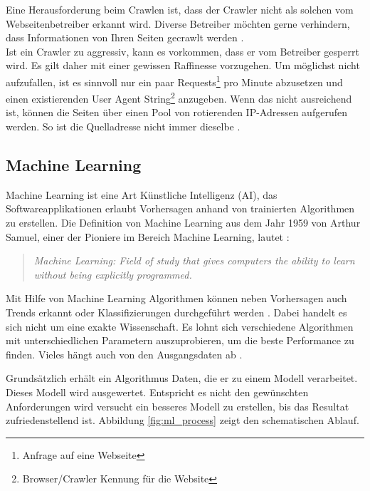 %
Eine Herausforderung beim Crawlen ist, dass der Crawler nicht als solchen vom Webseitenbetreiber erkannt wird. Diverse Betreiber möchten gerne verhindern, dass Informationen von Ihren Seiten gecrawlt werden \cite{comparis}.\\
Ist ein Crawler zu aggressiv, kann es vorkommen, dass er vom Betreiber gesperrt wird. Es gilt daher mit einer gewissen Raffinesse vorzugehen. Um möglichst nicht aufzufallen, ist es sinnvoll nur ein paar Requests\footnote{Anfrage auf eine Webseite} pro Minute abzusetzen und einen existierenden User Agent String\footnote{Browser/Crawler Kennung für die Website} anzugeben. Wenn das nicht ausreichend ist, können die Seiten über einen Pool von rotierenden IP-Adressen aufgerufen werden. So ist die Quelladresse nicht immer dieselbe \cite{offensive_crawling}.
%
\subsection{Machine Learning}
Machine Learning ist eine Art Künstliche Intelligenz (AI), das Softwareapplikationen erlaubt Vorhersagen anhand von trainierten Algorithmen zu erstellen.
Die Definition von Machine Learning aus dem Jahr 1959 von Arthur Samuel, einer der Pioniere im Bereich Machine Learning, lautet \cite{what_is_ml}:
  \begin{quote}
  \textit{Machine Learning: Field of study that gives computers the ability to learn without being explicitly programmed.}
  \end{quote}
Mit Hilfe von Machine Learning Algorithmen können neben Vorhersagen auch Trends erkannt oder Klassifizierungen durchgeführt werden \cite{ml_book}.
Dabei handelt es sich nicht um eine exakte Wissenschaft. Es lohnt sich verschiedene Algorithmen mit unterschiedlichen Parametern auszuprobieren, um die beste Performance zu finden. Vieles hängt auch von den Ausgangsdaten ab \cite{ml_azure}.

Grundsätzlich erhält ein Algorithmus Daten, die er zu einem Modell verarbeitet. Dieses Modell wird ausgewertet. Entspricht es nicht den gewünschten Anforderungen wird versucht ein besseres Modell zu erstellen, bis das Resultat zufriedenstellend ist. Abbildung \ref{fig:ml_process} zeigt den schematischen Ablauf.\\


